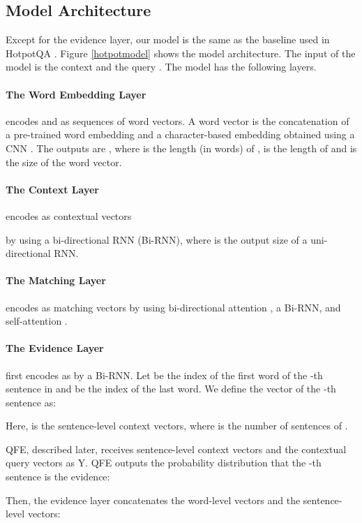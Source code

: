 \documentclass[11pt,a4paper]{article}
\theoremstyle{definition}
\begin{document}
	\subsection{Model Architecture}
	Except for the evidence layer, our model is the same as the baseline \cite{simple} used in HotpotQA \cite{hotpot}. Figure \ref{hotpotmodel} shows the model architecture. 
	The input of the model is the context  and the query .
	The model has the following layers.
	
    \paragraph{The Word Embedding Layer} encodes  and  
	as sequences of word vectors.
	A word vector is the concatenation of a pre-trained word embedding and
	a character-based embedding obtained using a CNN \cite{char}.
	The outputs are ,
	where  is the length (in words) of ,  is the length of  and
	 is the size of the word vector.

	\paragraph{The Context Layer}
	encodes  as contextual vectors
	
	by using a bi-directional RNN (Bi-RNN),
	where  is the output size of a uni-directional RNN.

	\paragraph{The Matching Layer}encodes  as matching vectors 
	by using bi-directional attention \cite{bidaf}, a Bi-RNN, and self-attention \cite{self}.
	
	\paragraph{The Evidence Layer} first encodes 
	as 
	 by a Bi-RNN.
	Let  be the index of the first word of the -th sentence in  and
	 be the index of the last word.
	We define the vector of the -th sentence as:
	
	Here,  is the sentence-level context vectors,
	where  is the number of sentences of .
	
	QFE, described later, receives sentence-level context vectors
	 and
	the contextual query vectors  as Y.
	QFE outputs the probability distribution that
	the -th sentence is the evidence:
	
	
	Then, the evidence layer concatenates
	the word-level vectors and the sentence-level vectors:
	
\end{document}
